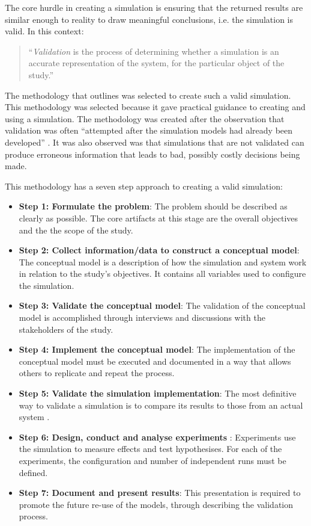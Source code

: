 The core hurdle in creating a simulation is ensuring that the returned results are similar enough to reality to draw meaningful conclusions, i.e. the simulation is valid.
In this context:
\begin{quotation}
``\textit{Validation} is the process of determining whether a simulation is an accurate representation of the system, for the particular object of the study.'' \citep{Law2005}
\end{quotation}

The methodology that \cite{Law2005} outlines was selected to create such a valid simulation.
This methodology was selected because it gave practical guidance to creating and using a simulation.
The methodology was created after the observation that validation was often ``attempted after the simulation models had already been developed'' \citep{Law2005}.
It was also observed was that simulations that are not validated can produce erroneous information that leads to bad, possibly costly decisions being made.

This methodology has a seven step approach to creating a valid simulation:
\begin{itemize}
  \item \textbf{Step 1: Formulate the problem}: %
	The problem should be described as clearly as possible.
	The core artifacts at this stage are the overall objectives and the the scope of the study.
\item \textbf{Step 2: Collect information/data to construct a conceptual model}: %
	The conceptual model is a description of how the simulation and system work in relation to the study's objectives.
	It contains all variables used to configure the simulation. 
\item \textbf{Step 3: Validate the conceptual model}: %
	The validation of the conceptual model is accomplished through interviews and discussions with the stakeholders of the study.
\item \textbf {Step 4: Implement the conceptual model}: %
	The implementation of the conceptual model must be executed and documented in a way that allows others to replicate and repeat the process.
\item \textbf{Step 5: Validate the simulation implementation}: %
	The most definitive way to validate a simulation is to compare its results to those from an actual system \citep{Law2005}.
\item \textbf{Step 6: Design, conduct and analyse experiments} :
	Experiments use the simulation to measure effects and test hypothesises. 
	For each of the experiments, the configuration and number of independent runs must be defined.
\item \textbf{Step 7: Document and present results}:
	This presentation is required to promote the future re-use of the models, through describing the validation process.
\end{itemize}

